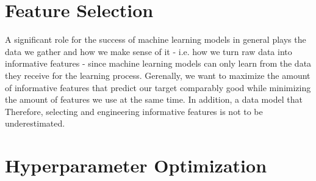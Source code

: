 \section{Feature Selection}

A significant role for the success of machine learning models in general plays the data we gather and how we make sense of it - i.e. how we turn raw data into informative features - since machine learning models can only learn from the data they receive for the learning process. Gerenally, we want to maximize the amount of informative features that predict our target comparably good while minimizing the amount of features we use at the same time. In addition, a data model that 
\newline
{} 
\newline
\newline
Therefore, selecting and engineering informative features is not to be underestimated. 

\section{Hyperparameter Optimization}


